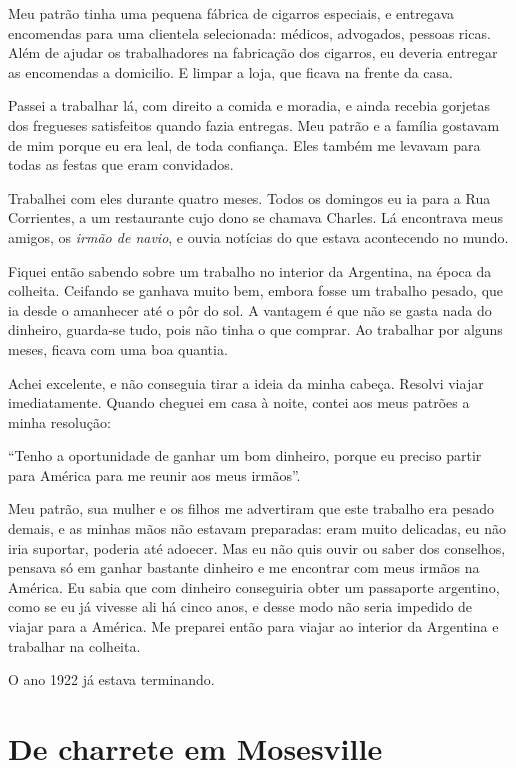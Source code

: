 Meu patrão tinha uma pequena fábrica de cigarros especiais, e
entregava encomendas para uma clientela selecionada: médicos,
advogados, pessoas ricas. Além de ajudar os trabalhadores na fabricação
dos cigarros, eu deveria entregar as encomendas a domicilio. E
limpar a loja, que ficava na frente da casa.

Passei a trabalhar lá, com direito a comida e moradia, e ainda
recebia gorjetas dos fregueses satisfeitos quando fazia entregas. Meu
patrão e a família gostavam de mim porque eu era leal, de toda
confiança. Eles também me levavam para todas as festas que eram convidados.

Trabalhei com eles durante quatro meses. Todos os domingos eu ia para a Rua
Corrientes, a um restaurante cujo dono se chamava Charles. Lá encontrava meus 
amigos, os \textit{irmão de navio}, e ouvia notícias do
que estava acontecendo no mundo.

Fiquei então sabendo sobre um trabalho no interior da Argentina, na
época da colheita. Ceifando se ganhava muito bem, embora fosse um
trabalho pesado, que ia desde o amanhecer até o pôr do sol. A vantagem é que
não se gasta nada do dinheiro, guarda-se tudo, pois não tinha o que
comprar. Ao trabalhar por alguns meses, ficava com uma boa quantia.

Achei excelente, e não conseguia tirar a ideia da minha
cabeça. Resolvi viajar imediatamente. Quando cheguei em casa à noite, contei aos meus patrões a minha
resolução:

``Tenho a oportunidade de ganhar um bom dinheiro, porque eu preciso
partir para América para me reunir aos meus irmãos''.

Meu patrão, sua mulher e os filhos me advertiram que este
trabalho era pesado demais, e as minhas mãos não estavam preparadas: eram
muito delicadas, eu não iria suportar, poderia até adoecer. Mas eu não
quis ouvir ou saber dos conselhos, pensava só em ganhar bastante
dinheiro e me encontrar com meus irmãos na América. Eu sabia que
com dinheiro conseguiria obter um passaporte argentino, como se eu já
vivesse ali há cinco anos, e desse modo não seria impedido 
de viajar para a América. Me preparei então para viajar ao interior da
Argentina e trabalhar na colheita.

O ano 1922 já estava terminando.

\chapter{De charrete em Mosesville}

